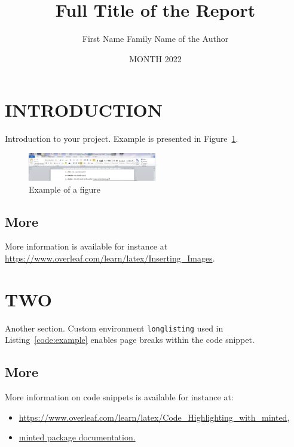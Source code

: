 \documentclass{reportOpenlab} %
\begin{document}
\title{Full Title of the Report}
\author{First Name Family Name of the Author}
\date{MONTH 2022}

\maketitlepage



\tableofcontents


\section{INTRODUCTION}
Introduction to your project. Example is presented in Figure~\ref{fig:example}.

\begin{figure}[h]
\centering
\includegraphics[width=0.5\textwidth]{assets/example.png}
\caption{Example of a figure~\cite{exampleCitation}}
\label{fig:example}
\end{figure}

\subsection{More}
More information is available for instance at \url{https://www.overleaf.com/learn/latex/Inserting_Images}.

\section{TWO}
Another section. Custom environment \texttt{longlisting} used in Listing~\ref{code:example} enables page breaks within the code snippet.

\subsection{More}
More information on code snippets is available for instance at:
\begin{itemize}
    \item \url{https://www.overleaf.com/learn/latex/Code_Highlighting_with_minted},
    \item \href{https://repo.skni.umcs.pl/ctan/macros/latex/contrib/minted/minted.pdf}{minted package documentation.}
\end{itemize}
\end{document}
